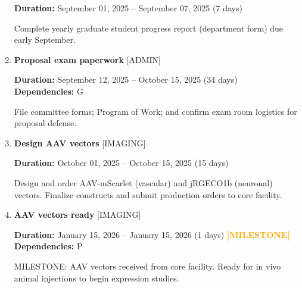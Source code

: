 \documentclass[landscape,a4paper]{article}
\begin{document}
\begin{enumerate}[leftmargin=1.5cm, itemsep=1em, parsep=0.5em]
          \vspace{0.2em}
          \textcolor{black!70}{\textbf{Duration:} September 01, 2025 -- September 07, 2025 (7 days)}

          \vspace{0.4em}
          \begin{minipage}[t]{0.9\textwidth}
          \textcolor{black!85}{Complete yearly graduate student progress report (department form) due early September.}
          \end{minipage}

    \item \textcolor{other}{\textbf{\large Proposal exam paperwork}}
          \hfill \textcolor{black!60}{\small [ADMIN]}
          
          \vspace{0.2em}
          \textcolor{black!70}{\textbf{Duration:} September 12, 2025 -- October 15, 2025 (34 days)}
          \\[0.2em]\textcolor{black!70}{\textbf{Dependencies:} G}\n
          \vspace{0.4em}
          \begin{minipage}[t]{0.9\textwidth}
          \textcolor{black!85}{File committee forms; Program of Work; and confirm exam room logistics for proposal defense.}
          \end{minipage}

    \item \textcolor{other}{\textbf{\large Design AAV vectors}}
          \hfill \textcolor{black!60}{\small [IMAGING]}
          
          \vspace{0.2em}
          \textcolor{black!70}{\textbf{Duration:} October 01, 2025 -- October 15, 2025 (15 days)}

          \vspace{0.4em}
          \begin{minipage}[t]{0.9\textwidth}
          \textcolor{black!85}{Design and order AAV-mScarlet (vascular) and jRGECO1b (neuronal) vectors. Finalize constructs and submit production orders to core facility.}
          \end{minipage}

    \item \textcolor{other}{\textbf{\large AAV vectors ready}}
          \hfill \textcolor{black!60}{\small [IMAGING]}
          
          \vspace{0.2em}
          \textcolor{black!70}{\textbf{Duration:} January 15, 2026 -- January 15, 2026 (1 days)}
          \textcolor{orange}{\textbf{ [MILESTONE]}}\n          \\[0.2em]\textcolor{black!70}{\textbf{Dependencies:} P}\n
          \vspace{0.4em}
          \begin{minipage}[t]{0.9\textwidth}
          \textcolor{black!85}{MILESTONE: AAV vectors received from core facility. Ready for in vivo animal injections to begin expression studies.}
          \end{minipage}


\end{enumerate}
\end{document}
